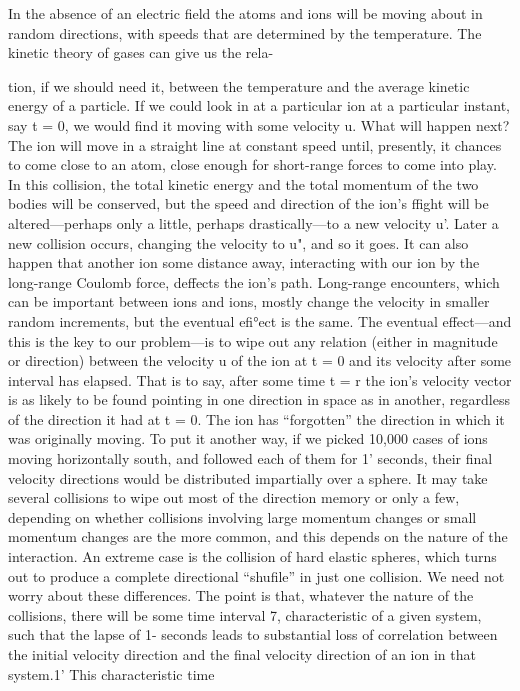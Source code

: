 In the absence of an electric field the atoms and ions will be moving
about in random directions, with speeds that are determined by
the temperature. The kinetic theory of gases can give us the rela-

tion, if we should need it, between the temperature and the average
kinetic energy of a particle. If we could look in at a particular ion
at a particular instant, say t = 0, we would find it moving with some
velocity u. What will happen next? The ion will move in a straight
line at constant speed until, presently, it chances to come close to an
atom, close enough for short-range forces to come into play. In this
collision, the total kinetic energy and the total momentum of the two
bodies will be conserved, but the speed and direction of the ion's
ffight will be altered---perhaps only a little, perhaps drastically---to
a new velocity u'. Later a new collision occurs, changing the velocity
to u", and so it goes. It can also happen that another ion some distance
away, interacting with our ion by the long-range Coulomb
force, deffects the ion's path. Long-range encounters, which can be
important between ions and ions, mostly change the velocity in
smaller random increments, but the eventual efi°ect is the same.
The eventual effect---and this is the key to our problem---is to wipe
out any relation (either in magnitude or direction) between the
velocity u of the ion at t = 0 and its velocity after some interval has
elapsed. That is to say, after some time t = r the ion's velocity vector
is as likely to be found pointing in one direction in space as in
another, regardless of the direction it had at t = 0. The ion has
``forgotten'' the direction in which it was originally moving. To put
it another way, if we picked 10,000 cases of ions moving horizontally
south, and followed each of them for 1' seconds, their final velocity
directions would be distributed impartially over a sphere. It may
take several collisions to wipe out most of the direction memory or
only a few, depending on whether collisions involving large momentum
changes or small momentum changes are the more common,
and this depends on the nature of the interaction. An extreme case
is the collision of hard elastic spheres, which turns out to produce a
complete directional ``shufile'' in just one collision. We need not
worry about these differences. The point is that, whatever the nature
of the collisions, there will be some time interval 7, characteristic of
a given system, such that the lapse of 1- seconds leads to substantial
loss of correlation between the initial velocity direction and the final
velocity direction of an ion in that system.1' This characteristic time

